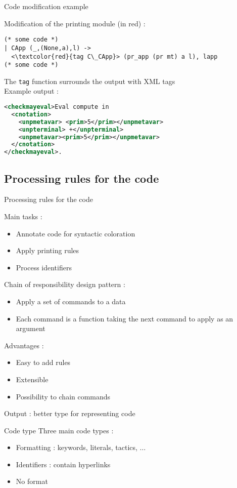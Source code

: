 \documentclass[compress]{beamer}
\newenvironment{tframe}[1]{
  \subsection{#1}
  \begin{frame}{#1}
  }{
  \end{frame}
  }
\begin{document}
  \begin{frame}[containsverbatim]{Code modification example}

    Modification of the printing module (in red) :
    \begin{lstlisting}[escapeinside=\<\>]
(* some code *)
| CApp (_,(None,a),l) ->
  <\textcolor{red}{tag C\_CApp}> (pr_app (pr mt) a l), lapp
(* some code *)
    \end{lstlisting}

    The \texttt{tag} function surrounds the output with XML tags \\
    Example output :
    \begin{lstlisting}[language=xml]
<checkmayeval>Eval compute in
  <cnotation>
    <unpmetavar> <prim>5</prim></unpmetavar>
    <unpterminal> +</unpterminal>
    <unpmetavar><prim>5</prim></unpmetavar>
  </cnotation>
</checkmayeval>.
\end{lstlisting}
  \end{frame}

  \begin{tframe}{Processing rules for the code}
        Main tasks :
        \begin{itemize}
          \item Annotate code for syntactic coloration
          \item Apply printing rules
          \item Process identifiers
        \end{itemize}
        \vfill
        Chain of responsibility design pattern :
        \begin{itemize}
          \item Apply a set of commands to a data
          \item Each command is a function taking the next command to apply as an argument
        \end{itemize}
        Advantages :
        \begin{itemize}
          \item Easy to add rules
          \item Extensible
          \item Possibility to chain commands
        \end{itemize}
        Output : better type for representing code
  \end{tframe}

  \begin{frame}{Code type}
    Three main code types :
    \begin{itemize}
      \item Formatting : keywords, literals, tactics, $\ldots$
      \item Identifiers : contain hyperlinks
      \item No format
    \end{itemize}
  \end{frame}
\end{document}
